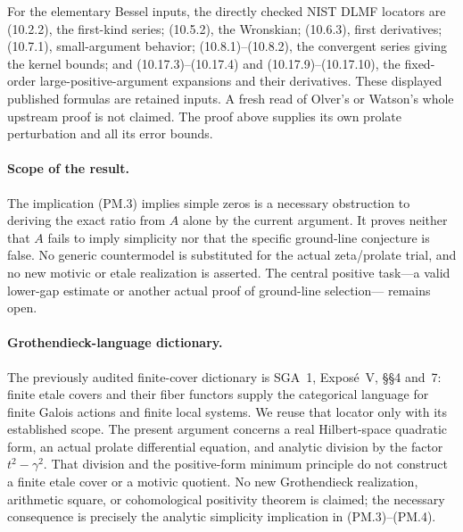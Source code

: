 For the elementary Bessel inputs, the directly checked NIST DLMF
locators are (10.2.2), the first-kind series; (10.5.2), the Wronskian;
(10.6.3), first derivatives;
(10.7.1), small-argument behavior; (10.8.1)--(10.8.2), the convergent
series giving the kernel bounds; and (10.17.3)--(10.17.4) and (10.17.9)--(10.17.10), the
fixed-order large-positive-argument expansions and their derivatives.  These displayed
published formulas are retained inputs.  A fresh read of Olver's or
Watson's whole upstream proof is not claimed.  The proof above supplies
its own prolate perturbation and all its error bounds.

\paragraph{Scope of the result.}
The implication (PM.3) implies simple zeros is a necessary obstruction
to deriving the exact ratio from \(A\) alone by the current argument.
It proves neither that \(A\) fails to imply simplicity nor that the
specific ground-line conjecture is false.  No generic countermodel is
substituted for the actual zeta/prolate trial, and no new motivic or
etale realization is asserted.  The central positive task---a valid
lower-gap estimate or another actual proof of ground-line selection---
remains open.


\paragraph{Grothendieck-language dictionary.}
The previously audited finite-cover dictionary is SGA~1,
Expos\'e~V, \S\S4 and~7: finite etale covers and their fiber functors
supply the categorical language for finite Galois actions and finite
local systems.  We reuse that locator only with its established scope.
The present argument concerns a real Hilbert-space quadratic form,
an actual prolate differential equation, and analytic division by the
factor \(t^2-\gamma^2\).  That division and the positive-form minimum
principle do not construct a finite etale cover or a motivic quotient.
No new Grothendieck realization, arithmetic square, or cohomological
positivity theorem is claimed; the necessary consequence is precisely
the analytic simplicity implication in (PM.3)--(PM.4).
